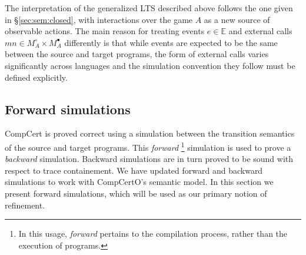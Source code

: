 \documentclass[acmsmall,authordraft]{acmart}
\newcommand{\kw}[1]{\ensuremath{ \mathsf{#1} }}
\newcommand{\bind}{\gg\!\!=}
\newcommand{\que}{\circ}
\newcommand{\ans}{\bullet}
\begin{document}
The interpretation of the generalized LTS described above
follows the one given in \S\ref{sec:sem:closed},
with interactions over the game $A$
as a new source of observable actions.
The main reason for treating
events $e \in \mathbb{E}$ and
external calls $m n \in M_A^\que \times M_A^\ans$
differently is that
while events are expected to be the same
between the source and target programs,
the form of external calls varies significantly
across languages
and the simulation convention they follow
must be defined explicitly.




\subsection{Forward simulations} \label{sec:sem:ref} %

CompCert is proved correct using a simulation
between the transition semantics of the source and target programs.
This \emph{forward}%
\footnote{In this usage, \emph{forward} pertains to
  the compilation process,
  rather than the execution of programs.}
simulation is used to prove a \emph{backward} simulation.
Backward simulations
are in turn proved to be sound with respect to trace containement.
We have updated forward and backward simulations to
work with CompCertO's semantic model.
In this section we present forward simulations,
which will be used as our primary notion of refinement.
\end{document}
